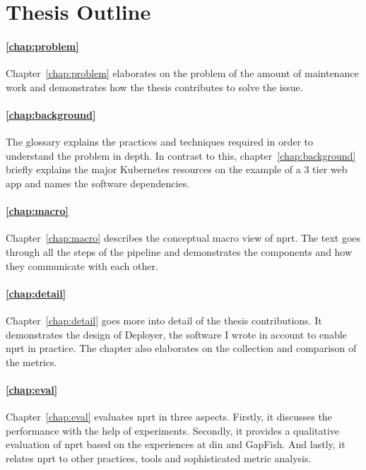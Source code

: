 \section{Thesis Outline}

\paragraph{\ref{chap:problem} }
Chapter~\ref{chap:problem} elaborates on the problem of the amount of maintenance work and
demonstrates how the thesis contributes to solve the issue.

\paragraph{\ref{chap:background} }
The glossary explains the practices and techniques required in order to understand the
problem in depth. In contrast to this, chapter~\ref{chap:background} briefly explains the
major Kubernetes resources on the example of a 3 tier web app and names the software
dependencies.

\paragraph{\ref{chap:macro} }
Chapter~\ref{chap:macro} describes the conceptual macro view of \gls{nprt}. The text goes
through all the steps of the pipeline and demonstrates the components and how they
communicate with each other.

\paragraph{\ref{chap:detail} }
Chapter~\ref{chap:detail} goes more into detail of the thesis contributions. It
demonstrates the design of Deployer, the software I wrote in account to enable \gls{nprt}
in practice. The chapter also elaborates on the collection and comparison of the metrics.

\paragraph{\ref{chap:eval} }
Chapter~\ref{chap:eval} evaluates \gls{nprt} in three aspects. Firstly, it discusses the
performance with the help of experiments. Secondly, it provides a qualitative evaluation
of \gls{nprt} based on the experiences at \gls{din} and GapFish. And lastly, it relates
\gls{nprt} to other practices, tools and sophisticated metric analysis.

